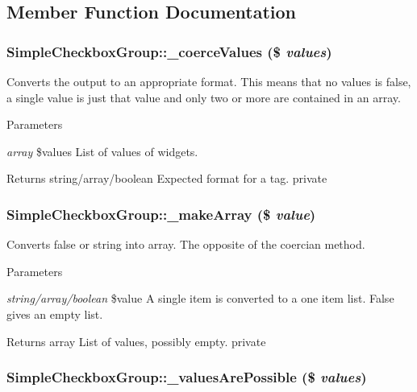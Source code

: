 \subsection{Member Function Documentation}
\hypertarget{class_simple_checkbox_group_afe4a2ea02b092de7e39f158d793eda48}{
\subsubsection[{\_\-coerceValues}]{\setlength{\rightskip}{0pt plus 5cm}SimpleCheckboxGroup::\_\-coerceValues (\$ {\em values})}}
\label{class_simple_checkbox_group_afe4a2ea02b092de7e39f158d793eda48}
Converts the output to an appropriate format. This means that no values is false, a single value is just that value and only two or more are contained in an array. 
\begin{DoxyParams}{Parameters}
\item[{\em array}]\$values List of values of widgets. \end{DoxyParams}
\begin{DoxyReturn}{Returns}
string/array/boolean Expected format for a tag.  private 
\end{DoxyReturn}
\hypertarget{class_simple_checkbox_group_ae5034a9e6326cbb740d709b1b5c6defe}{
\subsubsection[{\_\-makeArray}]{\setlength{\rightskip}{0pt plus 5cm}SimpleCheckboxGroup::\_\-makeArray (\$ {\em value})}}
\label{class_simple_checkbox_group_ae5034a9e6326cbb740d709b1b5c6defe}
Converts false or string into array. The opposite of the coercian method. 
\begin{DoxyParams}{Parameters}
\item[{\em string/array/boolean}]\$value A single item is converted to a one item list. False gives an empty list. \end{DoxyParams}
\begin{DoxyReturn}{Returns}
array List of values, possibly empty.  private 
\end{DoxyReturn}
\hypertarget{class_simple_checkbox_group_a7502967bd2c4adc191d9d1e8d1a7e8db}{
\subsubsection[{\_\-valuesArePossible}]{\setlength{\rightskip}{0pt plus 5cm}SimpleCheckboxGroup::\_\-valuesArePossible (\$ {\em values})}}
